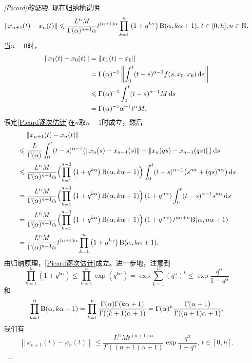 \begin{proof}[\cref{Picard}的证明]
    现在归纳地说明
    \begin{equation}\label{Picard逐次估计}
        \left\| x_{n+1}(t) - x_n(t) \right\|\leqslant \frac{L^n M}{\Gamma(\alpha)^{n+1} \alpha} t^{(n+1)\alpha} \prod_{k=1}^n \left(1+q^{k\alpha}\right) \mathrm{B}(\alpha, k\alpha+1),\,t\in [0,h],n\in\mathbb{N}.
    \end{equation}
    当$n=0$时，
    \begin{align*}
        \left\| x_1(t)-x_0(t) \right\|&=\| x_1(t)-x_0 \|\\
        &=\Gamma(\alpha)^{-1}\left\| \int_0^t (t-s)^{\alpha-1} f(s,x_0,x_0)\mathop{}\!\mathrm{d} s\right\|\\
        &\leqslant \Gamma(\alpha)^{-1}\int_0^t (t-s)^{\alpha-1} M\mathop{}\!\mathrm{d} s\\
        &=\Gamma(\alpha)^{-1} \alpha^{-1} t^\alpha M.
    \end{align*}
    假定\cref{Picard逐次估计}在$n$取$n-1$时成立，然后
    \begin{align*}
        &\relphantom{\leqslant} \left\| x_{n+1}(t)-x_n(t) \right\| \\ &\leqslant \frac{L}{\Gamma(\alpha)}\int_0^t (t-s)^{\alpha-1} \bigl(\left\|x_n(s)-x_{n-1}(s)\right\| + \left\|x_n(qs)-x_{n-1}(qs)\right\|\bigr) \differential s\\
        &\leqslant \frac{L^{n} M}{\Gamma(\alpha)^{n+1} \alpha} \Bigl(\prod_{k=1}^{n-1}\left(1+q^{k\alpha}\right) \Beta(\alpha, k\alpha+1)\Bigr)\int_0^t (t-s)^{\alpha-1} \bigl(s^{n\alpha} + (qs)^{n\alpha}\bigr) \differential s\\
        &=\frac{L^{n} M}{\Gamma(\alpha)^{n+1} \alpha} \Bigl(\prod_{k=1}^{n-1}\left(1+q^{k\alpha}\right) \Beta(\alpha, k\alpha+1)\Bigr) \left(1+q^{n\alpha}\right) \int_0^t (t-s)^{\alpha-1} s^{n\alpha} \differential s\\
        &=\frac{L^{n} M}{\Gamma(\alpha)^{n+1} \alpha} \Bigl(\prod_{k=1}^{n-1}\left(1+q^{k\alpha}\right) \Beta(\alpha, k\alpha+1)\Bigr) \left(1+q^{n\alpha}\right) t^{n\alpha+\alpha}\Beta(\alpha, n\alpha+1)\\
        &=\frac{L^n M}{\Gamma(\alpha)^{n+1} \alpha} t^{(n+1)\alpha} \prod_{k=1}^n \left(1+q^{k\alpha}\right) \Beta(\alpha, k\alpha+1).
    \end{align*}
    由归纳原理，\cref{Picard逐次估计}成立。进一步地，注意到
    \begin{equation*}
        \prod_{k=1}^n \left(1+q^{k\alpha}\right)\leqslant \prod_{k=1}^n \exp\left(q^{k\alpha}\right)=\exp \sum_{k=1}^n \left(q^\alpha\right)^k\leqslant \exp \frac{q^\alpha}{1-q^\alpha}
    \end{equation*}
    和
    \begin{equation*}
        \prod_{k=1}^n \mathrm{B}(\alpha, k\alpha+1)=\prod_{k=1}^n \frac{\Gamma(\alpha) \Gamma(k\alpha+1)}{\Gamma((k+1)\alpha+1)}=\Gamma(\alpha)^n \frac{\Gamma(\alpha+1)}{\Gamma((n+1)\alpha+1)},
    \end{equation*}
    我们有
    \begin{equation}
        \left\| x_{n+1}(t) - x_n(t) \right\|\leqslant \frac{L^n M t^{(n+1)\alpha}}{\Gamma((n+1)\alpha+1)} \exp \frac{q^\alpha}{1-q^\alpha},\,t\in [0,h].
    \end{equation}


\end{proof}
